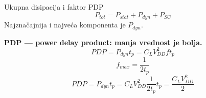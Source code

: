 \begin{frame}[label=09_2-s060]{Ukupna disipacija i faktor PDP}
\[P_{tot}=P_{stat}+P_{dyn}+P_{SC}\]
Najznačajnija i najveća komponenta je $P_{dyn}$.\par\medskip\textbf{PDP — power delay product: manja vrednost je bolja.}\[PDP=P_{dyn}t_p=C_LV_{DD}^2ft_p\]
\[f_{max}=\frac1{2t_p}\]
\[PDP=P_{dyn}t_p=C_LV_{DD}^2\frac1{2t_p}t_p=\frac{C_LV_{DD}^2}2\]

\end{frame}
